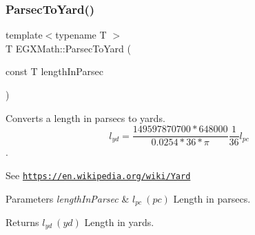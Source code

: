 \subsubsection{\texorpdfstring{Parsec\+To\+Yard()}{ParsecToYard()}}
{\footnotesize\ttfamily template$<$typename T $>$ \\
T E\+G\+X\+Math\+::\+Parsec\+To\+Yard (\begin{DoxyParamCaption}\item[{const T}]{length\+In\+Parsec }\end{DoxyParamCaption})}



Converts a length in parsecs to yards. \[ l_{yd}= \frac{149597870700 * 648000}{0.0254 * 36 * \pi} \frac{1}{36} l_{pc} \]. 

See \href{https://en.wikipedia.org/wiki/Yard}{\tt https\+://en.\+wikipedia.\+org/wiki/\+Yard} 
\begin{DoxyParams}{Parameters}
{\em length\+In\+Parsec} & $ l_{pc}\ (pc)$ Length in parsecs. \\
\hline
\end{DoxyParams}
\begin{DoxyReturn}{Returns}
$ l_{yd}\ (yd)$ Length in yards. 
\end{DoxyReturn}
